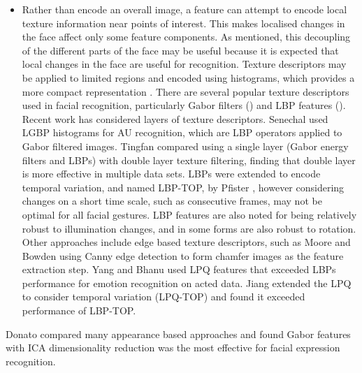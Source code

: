 \begin{itemize}
 \item Rather than encode an overall image, a feature can attempt to encode local texture information near points of interest. This makes localised changes in the face affect only some feature components. As mentioned, this decoupling of the different parts of the face may be useful because it is expected that local changes in the face are useful for recognition. Texture descriptors may be applied to limited regions and encoded using histograms, which provides a more compact representation \cite{Feng2005, Shan2009, Pfister2011, Moore2009, Yang2011, Tingfan2012}. There are several popular texture descriptors used in facial recognition, particularly Gabor filters (\cite{Bartlett2006, Wang2006, Rose2006}) and \ac{LBP} features (\cite{Feng2005, Shan2009, Yang2011, Moore2009}). Recent work has considered layers of texture descriptors. Senechal \etal \cite{Senechal2012} used \ac{LGBP} histograms for \ac{AU} recognition, which are \ac{LBP} operators applied to Gabor filtered images. Tingfan \cite{Tingfan2012} compared using a single layer (Gabor energy filters and \ac{LBP}s) with double layer texture filtering, finding that double layer is more effective in multiple data sets.
\ac{LBP}s were extended to encode temporal variation, and named \ac{LBP}-\ac{TOP}, by Pfister \etal \cite{Pfister2011}, however considering changes on a short time scale, such as consecutive frames, may not be optimal for all facial gestures. \ac{LBP} features are also noted for being relatively robust to illumination changes, and in some forms are also robust to rotation. Other approaches include edge based texture descriptors, such as Moore and Bowden \cite{Moore07} using Canny edge detection to form chamfer images as the feature extraction step. Yang and Bhanu \cite{Yang2011} used \ac{LPQ} features that exceeded \ac{LBP}s performance for emotion recognition on acted data. Jiang \cite{Jiang2011} extended the \ac{LPQ} to consider temporal variation (\ac{LPQ}-\ac{TOP}) and found it exceeded performance of \ac{LBP}-\ac{TOP}.
\end{itemize}

Donato \etal \cite{Donato1999} compared many appearance based approaches and found Gabor features with \ac{ICA} dimensionality reduction was the most effective for facial expression recognition.


